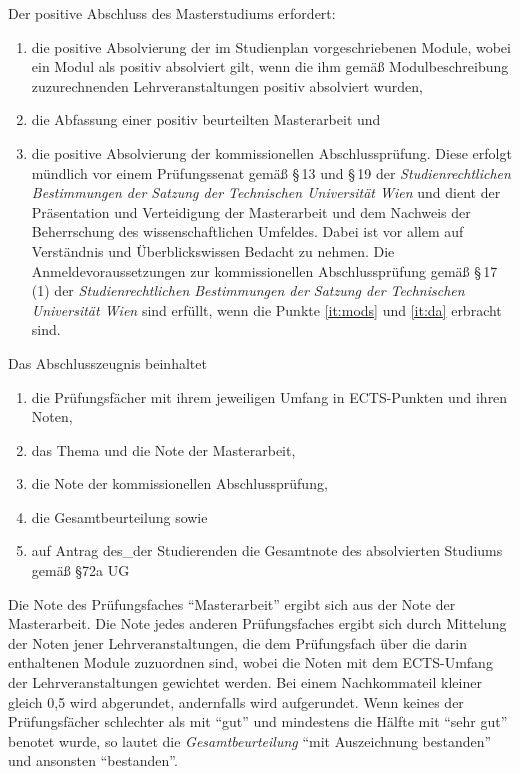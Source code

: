 Der positive Abschluss des Masterstudiums erfordert:
\begin{enumerate}
\item \label{it:mods} die positive Absolvierung der im
  Studienplan vorgeschriebenen Module, wobei ein Modul als positiv
  absolviert gilt, wenn die ihm gemäß Modulbeschreibung zuzurechnenden
  Lehrveranstaltungen positiv absolviert wurden,
\item \label{it:da} die Abfassung einer positiv beurteilten Masterarbeit%
   und
\item die positive Absolvierung der kommissionellen
  Abschlussprüfung. Diese erfolgt mündlich vor einem Prüfungssenat
  gemäß \S\,13 und \S\,19 der \emph{Studienrechtlichen Bestimmungen
  der Satzung der Technischen Universität Wien} und dient der
  Präsentation und Verteidigung der Masterarbeit und dem Nachweis der
  Beherrschung des wissenschaftlichen Umfeldes. Dabei ist vor allem
  auf Verständnis und Überblickswissen Bedacht zu nehmen. Die
  Anmelde\-voraussetzungen zur kommissionellen Abschlussprüfung gemäß
  \S\,17\,(1) der \emph{Studienrechtlichen Bestimmungen der Satzung
  der Technischen Universität Wien} sind erfüllt, wenn die Punkte
  \ref{it:mods} und \ref{it:da} erbracht sind.
\end{enumerate}
Das Abschlusszeugnis beinhaltet
\begin{enumerate}[label=(\alph*)]
\item \label{it:pfs} die Prüfungsfächer mit ihrem jeweiligen Umfang in
  ECTS-Punkten und ihren Noten,
\item das Thema und die Note der Masterarbeit,
\item die Note der kommissionellen Abschlussprüfung,
\item die Gesamtbeurteilung sowie 
\item auf Antrag des\_der Studierenden die Gesamtnote des absolvierten 
Studiums gemäß §72a UG%
%
\end{enumerate}
Die Note des Prüfungsfaches "`Masterarbeit"' ergibt sich aus der 
Note der Masterarbeit. Die Note jedes anderen Prüfungsfaches 
ergibt sich durch Mittelung der Noten
jener Lehrveranstaltungen, die dem Prüfungsfach über die darin
enthaltenen Module zuzuordnen sind, wobei die Noten mit dem
ECTS-Umfang der Lehrveranstaltungen gewichtet werden. Bei einem
Nachkommateil kleiner gleich 0,5 wird abgerundet, andernfalls
wird aufgerundet. Wenn keines der Prüfungsfächer schlechter als mit 
"`gut"' und mindestens die Hälfte mit "`sehr gut"' benotet wurde, so 
lautet die \emph{Gesamtbeurteilung} "`mit Auszeichnung bestanden"' 
und ansonsten "`bestanden"'. 

